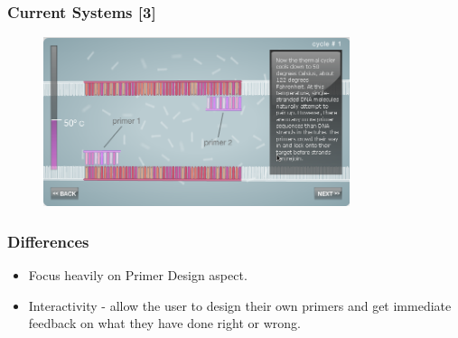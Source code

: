 \begin{frame}
\frametitle{Current Systems [3]}
\begin{figure}
  \begin{center}
    \includegraphics[width=0.8\textwidth]{./img/currentSystems3-6.png}
  \end{center}
\end{figure}
\end{frame}

\begin{frame}
\frametitle{Differences}
\begin{itemize}
\item Focus heavily on Primer Design aspect.
\item Interactivity - allow the user to design their own primers and get
immediate feedback on what they have done right or wrong.
\end{itemize}
\end{frame}















